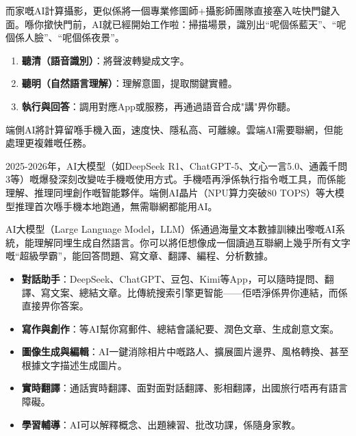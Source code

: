 


而家嘅AI計算攝影，更似係將一個專業修圖師+攝影師團隊直接塞入咗快門鍵入面。喺你撳快門前，AI就已經開始工作啦：掃描場景，識別出“呢個係藍天”、“呢個係人臉”、“呢個係夜景”。


\begin{enumerate}
  \item \textbf{聽清（語音識別）}：將聲波轉變成文字。
  \item \textbf{聽明（自然語言理解）}：理解意圖，提取關鍵實體。
  \item \textbf{執行與回答}：調用對應App或服務，再通過語音合成"講"畀你聽。
\end{enumerate}


端側AI將計算留喺手機入面，速度快、隱私高、可離線。雲端AI需要聯網，但能處理更複雜嘅任務。


2025-2026年，AI大模型（如DeepSeek R1、ChatGPT-5、文心一言5.0、通義千問3等）嘅爆發深刻改變咗手機嘅使用方式。手機唔再淨係執行指令嘅工具，而係能理解、推理同埋創作嘅智能夥伴。端側AI晶片（NPU算力突破80 TOPS）等大模型推理首次喺手機本地跑通，無需聯網都能用AI。


AI大模型（Large Language Model，LLM）係通過海量文本數據訓練出嚟嘅AI系統，能理解同埋生成自然語言。你可以將佢想像成一個讀過互聯網上幾乎所有文字嘅“超級學霸”，能回答問題、寫文章、翻譯、編程、分析數據。


\begin{itemize}
  \item \textbf{對話助手}：DeepSeek、ChatGPT、豆包、Kimi等App，可以隨時提問、翻譯、寫文案、總結文章。比傳統搜索引擎更智能——佢唔淨係畀你連結，而係直接畀你答案。
  \item \textbf{寫作與創作}：等AI幫你寫郵件、總結會議紀要、潤色文章、生成創意文案。
  \item \textbf{圖像生成與編輯}：AI一鍵消除相片中嘅路人、擴展圖片邊界、風格轉換、甚至根據文字描述生成圖片。
  \item \textbf{實時翻譯}：通話實時翻譯、面對面對話翻譯、影相翻譯，出國旅行唔再有語言障礙。
  \item \textbf{學習輔導}：AI可以解釋概念、出題練習、批改功課，係隨身家教。
\end{itemize}

